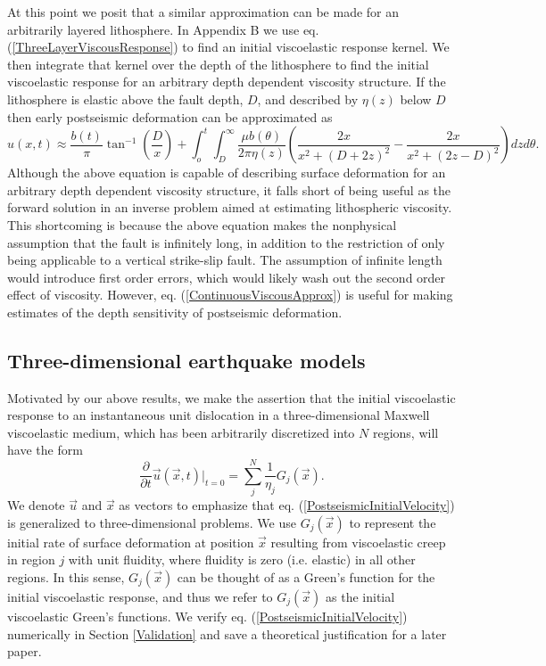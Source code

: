 \documentclass[extra,mreferee]{gji}
\begin{document}
At this point we posit that a similar approximation can be made for an
arbitrarily layered lithosphere. In Appendix B we use
eq. (\ref{ThreeLayerViscousResponse}) to find an initial viscoelastic
response kernel.  We then integrate that kernel over the depth of the
lithosphere to find the initial viscoelastic response for an arbitrary
depth dependent viscosity structure.  If the lithosphere is elastic
above the fault depth, $D$, and described by $\eta(z)$ below $D$ then
early postseismic deformation can be approximated as
\begin{equation}\label{ContinuousViscousApprox}
u(x,t) \approx \frac{b(t)}{\pi}\tan^{-1}(\frac{D}{x}) + 
               \int_o^t\int_D^\infty \frac{\mu b(\theta)}{2\pi\eta(z)}
                                    \left(\frac{2x}{x^2 + \left(D + 2z\right)^2} - 
                                    \frac{2x}{x^2 + \left(2z - D\right)^2}\right)
                                    dz d\theta.
\end{equation}
Although the above equation is capable of describing surface
deformation for an arbitrary depth dependent viscosity structure, it
falls short of being useful as the forward solution in an inverse
problem aimed at estimating lithospheric viscosity.  This shortcoming
is because the above equation makes the nonphysical assumption that the
fault is infinitely long, in addition to the restriction of only being
applicable to a vertical strike-slip fault.  The assumption of
infinite length would introduce first order errors, which would likely
wash out the second order effect of viscosity. However,
eq. (\ref{ContinuousViscousApprox}) is useful for making estimates of
the depth sensitivity of postseismic deformation.

\subsection{Three-dimensional earthquake models}\label{3DModel}
Motivated by our above results, we make the assertion that the initial
viscoelastic response to an instantaneous unit dislocation in a
three-dimensional Maxwell viscoelastic medium, which has been
arbitrarily discretized into $N$ regions, will have the form
\begin{equation}\label{PostseismicInitialVelocity}
  \frac{\partial}{\partial t}\vec{u}(\vec{x},t)\big|_{t=0} = \sum_j^N\frac{1}{\eta_j}G_j(\vec{x}).
\end{equation}
We denote $\vec{u}$ and $\vec{x}$ as vectors to emphasize that
eq. (\ref{PostseismicInitialVelocity}) is generalized to
three-dimensional problems.  We use $G_j(\vec{x})$ to represent the
initial rate of surface deformation at position $\vec{x}$ resulting
from viscoelastic creep in region $j$ with unit fluidity, where
fluidity is zero (i.e. elastic) in all other regions.  In this sense,
$G_j(\vec{x})$ can be thought of as a Green's function for the initial
viscoelastic response, and thus we refer to $G_j(\vec{x})$ as the initial
viscoelastic Green's functions.  We verify
eq. (\ref{PostseismicInitialVelocity}) numerically in Section \ref{Validation} and
save a theoretical justification for a later paper.
\end{document}

